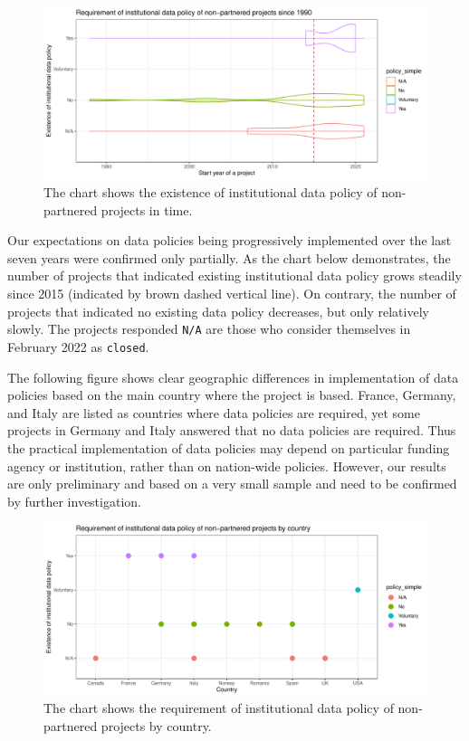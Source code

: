 \documentclass[
  12pt,
]{scrreprt}
\begin{document}
\begin{figure}

{\centering \includegraphics{01_FAIR_epi_report_files/figure-latex/unnamed-chunk-36-1} 

}

\caption{The chart shows the existence of institutional data policy of non-partnered projects in time.}\label{fig:unnamed-chunk-36}
\end{figure}

Our expectations on data policies being progressively implemented over
the last seven years were confirmed only partially. As the chart below
demonstrates, the number of projects that indicated existing
institutional data policy grows steadily since 2015 (indicated by brown
dashed vertical line). On contrary, the number of projects that
indicated no existing data policy decreases, but only relatively slowly.
The projects responded \texttt{N/A} are those who consider themselves in
February 2022 as \texttt{closed}.

The following figure shows clear geographic differences in
implementation of data policies based on the main country where the
project is based. France, Germany, and Italy are listed as countries
where data policies are required, yet some projects in Germany and Italy
answered that no data policies are required. Thus the practical
implementation of data policies may depend on particular funding agency
or institution, rather than on nation-wide policies. However, our
results are only preliminary and based on a very small sample and need
to be confirmed by further investigation.

\begin{figure}

{\centering \includegraphics{01_FAIR_epi_report_files/figure-latex/unnamed-chunk-38-1} 

}

\caption{The chart shows the requirement of institutional data policy of non-partnered projects by country.}\label{fig:unnamed-chunk-38}
\end{figure}
\end{document}
